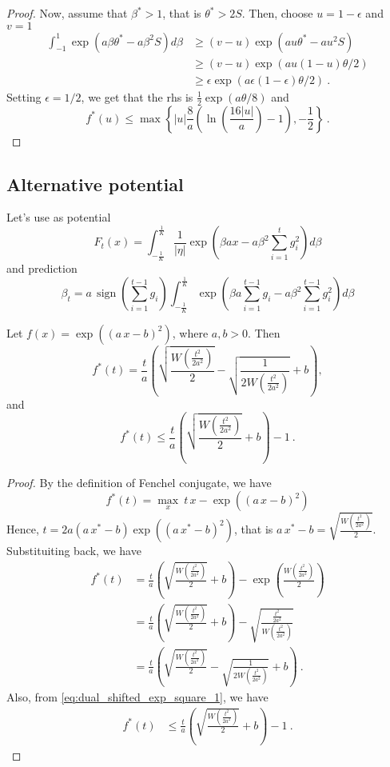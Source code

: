 \documentclass{colt2016_empty} %
\DeclareMathOperator{\sign}{sign}
\begin{document}
\begin{proof}
Now, assume that $\beta^*>1$, that is $\theta^*>2 S$. Then, choose $u=1-\epsilon$ and $v=1$
\begin{align}
\int_{-1}^{1} \exp(a \beta \theta^* - a \beta^2 S) d\beta 
&\geq (v-u) \exp(a u \theta^* - a u^2 S) \\
&\geq (v-u) \exp(a u(1 - u )\theta/2) \\
&\geq \epsilon \exp(a \epsilon(1 - \epsilon )\theta/2)~.
\end{align}
Setting $\epsilon=1/2$, we get that the rhs is $\frac{1}{2} \exp(a \theta/8)$ and
\[
f^*(u) \leq \max\left\{|u| \frac{8}{a} \left(\ln\left(\frac{16 |u|}{a}\right)-1\right),-\frac{1}{2}\right\}~.
\]

\end{proof}

\subsection{Alternative potential}

Let's use as potential 
\[
F_t(x)=\int_{-\tfrac{1}{K}}^{\tfrac{1}{K}} \frac{1}{|\eta|}\exp(\beta a x - a \beta^2 \sum_{i=1}^t g_i^2) d\beta
\]
and prediction
\[
\beta_{t}= a \, \sign\left(\sum_{i=1}^{t-1} g_i\right) \int_{-\tfrac{1}{K}}^{\tfrac{1}{K}} \exp(\beta a \sum_{i=1}^{t-1} g_i - a \beta^2 \sum_{i=1}^{t-1} g_i^2) d\beta
\]

\begin{lemma}
\label{lemma:dual_shifted_exp_square}
Let $f(x)=\exp((a\,x-b)^2)$, where $a,b>0$. Then 
\[
f^*(t) = \frac{t}{a} \left(\sqrt{\frac{W(\frac{t^2}{2 a^2})}{2}}-\sqrt{\frac{1}{2 W(\frac{t^2}{2 a^2})}}+b\right),
\]
and
\[
f^*(t) \leq \frac{t}{a} \left(\sqrt{\frac{W(\frac{t^2}{2 a^2})}{2}}+b\right)-1 ~.
\]
\end{lemma}
%
\begin{proof}
By the definition of Fenchel conjugate, we have
\[
f^*(t) = \max_x \ t\,x - \exp((a\,x-b)^2)
\]
Hence, $t=2 a (a\,x^*-b) \exp((a\,x^*-b)^2)$, that is $a\,x^*-b=\sqrt{\frac{W(\frac{t^2}{2 a^2})}{2}}$.
Substituiting back, we have
\begin{align}
f^*(t) 
&= \frac{t}{a} \left(\sqrt{\frac{W(\frac{t^2}{2 a^2})}{2}}+b\right)-\exp\left(\frac{W(\frac{t^2}{2 a^2})}{2}\right) \label{eq:dual_shifted_exp_square_1}\\
&= \frac{t}{a} \left(\sqrt{\frac{W(\frac{t^2}{2 a^2})}{2}}+b\right)-\sqrt{\frac{\frac{t^2}{2 a^2}}{W(\frac{t^2}{2 a^2})}} \nonumber \\
&= \frac{t}{a} \left(\sqrt{\frac{W(\frac{t^2}{2 a^2})}{2}}-\sqrt{\frac{1}{2 W(\frac{t^2}{2 a^2})}}+b\right)~. \nonumber 
\end{align}
Also, from \eqref{eq:dual_shifted_exp_square_1}, we have
\begin{align}
f^*(t) 
&\leq \frac{t}{a} \left(\sqrt{\frac{W(\frac{t^2}{2 a^2})}{2}}+b\right)-1 ~.
\end{align}
\end{proof}
\end{document}

